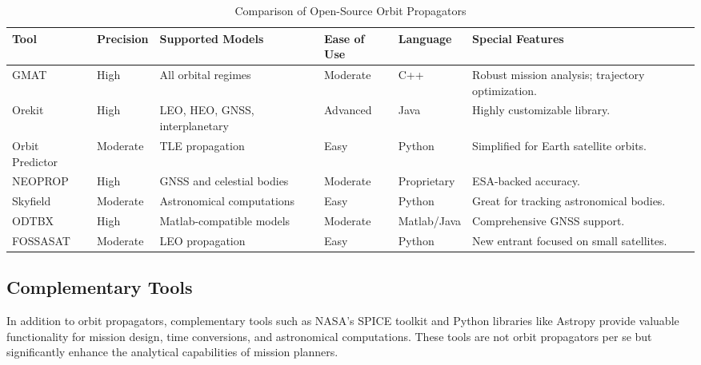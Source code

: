 \documentclass[a4paper,10pt]{article}
\begin{document}
\begin{sidewaystable}[h!]
\centering
\begin{tabular}{lllllp{5cm}|} %
\hline
\textbf{Tool}            & \textbf{Precision} & \textbf{Supported Models}      & \textbf{Ease of Use} & \textbf{Language}   & \textbf{Special Features} \\
\hline
GMAT                    & High               & All orbital regimes            & Moderate             & C++                 & Robust mission analysis; trajectory optimization. \\
Orekit                  & High               & LEO, HEO, GNSS, interplanetary & Advanced             & Java                & Highly customizable library. \\
Orbit Predictor         & Moderate           & TLE propagation                & Easy                 & Python              & Simplified for Earth satellite orbits. \\
NEOPROP                 & High               & GNSS and celestial bodies      & Moderate             & Proprietary         & ESA-backed accuracy. \\
Skyfield                & Moderate           & Astronomical computations      & Easy                 & Python              & Great for tracking astronomical bodies. \\
ODTBX                   & High               & Matlab-compatible models       & Moderate             & Matlab/Java         & Comprehensive GNSS support. \\
FOSSASAT                & Moderate           & LEO propagation                & Easy                 & Python              & New entrant focused on small satellites. \\
\hline
\end{tabular}
\caption{Comparison of Open-Source Orbit Propagators}
\label{tab:propagator_comparison}
\end{sidewaystable}

\subsection{Complementary Tools}
In addition to orbit propagators, complementary tools such as NASA's SPICE toolkit and Python libraries like Astropy provide valuable functionality for mission design, time conversions, and astronomical computations. These tools are not orbit propagators per se but significantly enhance the analytical capabilities of mission planners.
\end{document}
